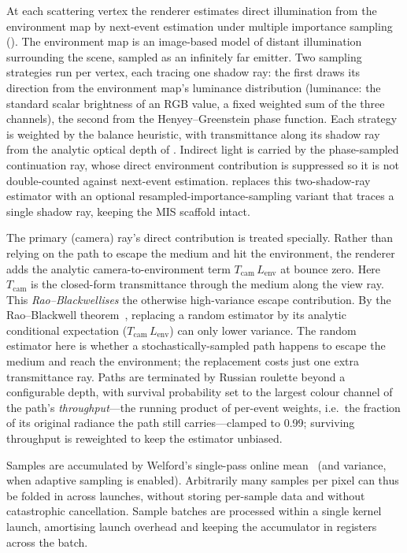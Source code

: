 At each scattering vertex the renderer estimates direct illumination from the environment map by
next-event estimation under multiple importance sampling ().
The environment map is an image-based model of distant illumination surrounding the scene, sampled
as an infinitely far emitter. Two sampling strategies run per vertex, each tracing one
shadow ray: the first draws its direction from the environment map's luminance distribution (luminance: the
standard scalar brightness of an RGB value, a fixed weighted sum of the three channels), the second from the Henyey--Greenstein phase function. Each strategy is
weighted by the balance heuristic, with transmittance along its shadow ray from the
analytic optical depth of . Indirect light is carried by the phase-sampled continuation ray, whose direct
environment contribution is suppressed so it is not double-counted against next-event estimation.
 replaces this two-shadow-ray estimator with an optional
resampled-importance-sampling variant that traces a single shadow ray, keeping the MIS scaffold intact.

The primary (camera) ray's direct contribution is treated specially. Rather than relying on the path to
escape the medium and hit the environment, the renderer adds the analytic camera-to-environment term
$T_{\text{cam}}\,L_{\text{env}}$ at bounce zero. Here $T_{\text{cam}}$ is the closed-form transmittance
through the medium along the view ray. This \emph{Rao--Blackwellises} the otherwise high-variance
escape contribution. By the Rao--Blackwell theorem~\cite{Rao1945,Blackwell1947}, replacing a random
estimator by its analytic conditional expectation ($T_{\text{cam}}\,L_{\text{env}}$) can only lower
variance. The random estimator here is whether a stochastically-sampled path happens to escape the
medium and reach the environment; the replacement costs just one extra transmittance ray. Paths are terminated by Russian roulette beyond a configurable depth,
with survival probability set to the largest colour channel of the path's
\emph{throughput}---the running product of per-event weights, i.e.\ the fraction of its
original radiance the path still carries---clamped to \num{0.99}; surviving throughput
is reweighted to keep the estimator unbiased.

Samples are accumulated by Welford's single-pass online mean~\cite{Welford1962} (and variance, when adaptive sampling is
enabled). Arbitrarily many samples per pixel can thus be folded in across launches, without storing
per-sample data and without catastrophic cancellation. Sample batches are processed within a single
kernel launch, amortising launch overhead and keeping the accumulator in registers across the batch.

